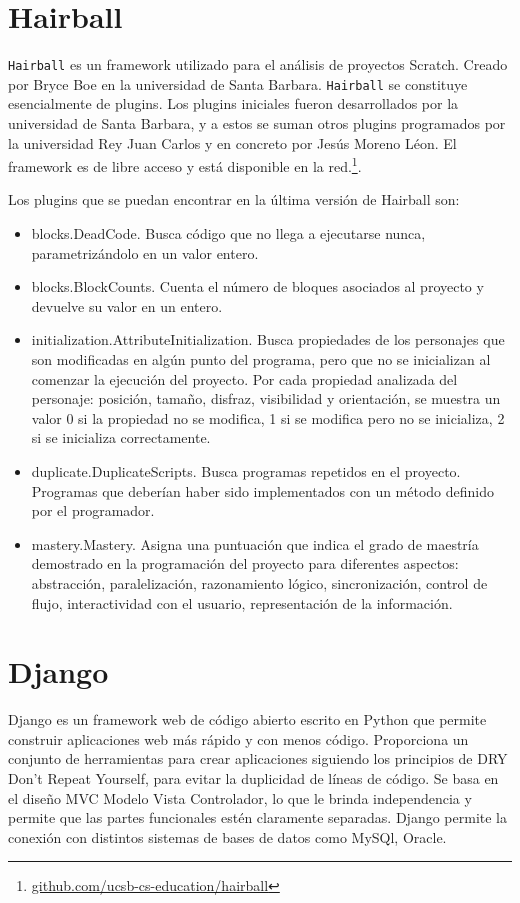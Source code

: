 \documentclass[a4paper, 12pt]{book}
\begin{document}
\section{Hairball}
\label{sec:seccion3}
\texttt{Hairball} es un framework utilizado para el análisis de proyectos Scratch. Creado 
por Bryce Boe en la universidad de Santa Barbara. \texttt{Hairball} se constituye esencialmente de 
plugins. Los plugins iniciales fueron desarrollados por la universidad de Santa Barbara, y
a estos se suman otros plugins programados por la universidad Rey Juan Carlos y en concreto
por Jesús Moreno Léon. El framework es de libre acceso y está disponible en la 
red.\footnote{\url{github.com/ucsb-cs-education/hairball}}.

Los plugins que se puedan encontrar en la última versión de Hairball son:

\begin{itemize}
  \item blocks.DeadCode.
  Busca código que no llega a ejecutarse nunca, parametrizándolo en un valor entero.
  \item blocks.BlockCounts.
  Cuenta el número de bloques asociados al proyecto y devuelve su valor en un entero.
  \item initialization.AttributeInitialization.
  Busca propiedades de los personajes que son modificadas en algún punto del programa,
  pero que no se inicializan al comenzar la 	ejecución del proyecto. Por cada propiedad
  analizada del personaje: posición, tamaño, 	disfraz, visibilidad y orientación, se
  muestra un valor 0 si la propiedad no se modifica, 	1 si se modifica pero no se inicializa,
  2 si se inicializa correctamente.
  \item duplicate.DuplicateScripts.
  Busca programas repetidos en el proyecto. Programas que deberían haber sido implementados
  con un método definido por el programador.
  \item mastery.Mastery.
  Asigna una puntuación que indica el grado de maestría demostrado en la programación del
  proyecto para diferentes aspectos: abstracción, paralelización, razonamiento lógico,
  sincronización, control de flujo, interactividad con el usuario, representación de la información.
	
	
\end{itemize}


\section{Django}
\label{sec:seccion4}
Django es un framework web de código abierto escrito en Python que permite construir aplicaciones
web más rápido y con menos código. Proporciona un conjunto de herramientas para crear aplicaciones
siguiendo los principios de DRY Don't Repeat Yourself, para evitar la duplicidad de líneas de código.
Se basa en el diseño MVC Modelo Vista Controlador, lo que le brinda independencia y permite que
las partes funcionales estén claramente separadas.
Django permite la conexión con distintos sistemas de bases de datos como MySQl, Oracle.
\end{document}
